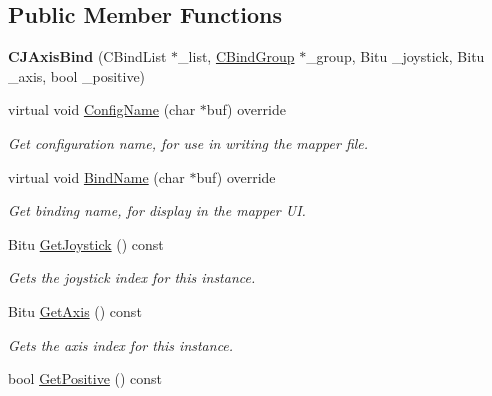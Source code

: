 \subsection*{Public Member Functions}
\begin{DoxyCompactItemize}
\item 
\hypertarget{classCJAxisBind_a80b5b1ae676d9282c7ca3db9d54a9cd6}{{\bfseries C\-J\-Axis\-Bind} (C\-Bind\-List $\ast$\-\_\-list, \hyperlink{classCBindGroup}{C\-Bind\-Group} $\ast$\-\_\-group, Bitu \-\_\-joystick, Bitu \-\_\-axis, bool \-\_\-positive)}\label{classCJAxisBind_a80b5b1ae676d9282c7ca3db9d54a9cd6}

\item 
\hypertarget{classCJAxisBind_ad6469ca1df5b2e95f501cbf66df85ae0}{virtual void \hyperlink{classCJAxisBind_ad6469ca1df5b2e95f501cbf66df85ae0}{Config\-Name} (char $\ast$buf) override}\label{classCJAxisBind_ad6469ca1df5b2e95f501cbf66df85ae0}

\begin{DoxyCompactList}\small\item\em Get configuration name, for use in writing the mapper file. \end{DoxyCompactList}\item 
\hypertarget{classCJAxisBind_a975eada416c60a679dda6574cc4d5bd5}{virtual void \hyperlink{classCJAxisBind_a975eada416c60a679dda6574cc4d5bd5}{Bind\-Name} (char $\ast$buf) override}\label{classCJAxisBind_a975eada416c60a679dda6574cc4d5bd5}

\begin{DoxyCompactList}\small\item\em Get binding name, for display in the mapper U\-I. \end{DoxyCompactList}\item 
\hypertarget{classCJAxisBind_a033065f2f64ac52bfac7bf1d0aff17c3}{Bitu \hyperlink{classCJAxisBind_a033065f2f64ac52bfac7bf1d0aff17c3}{Get\-Joystick} () const }\label{classCJAxisBind_a033065f2f64ac52bfac7bf1d0aff17c3}

\begin{DoxyCompactList}\small\item\em Gets the joystick index for this instance. \end{DoxyCompactList}\item 
\hypertarget{classCJAxisBind_a6d9c9e742943700c75971a13bd827d42}{Bitu \hyperlink{classCJAxisBind_a6d9c9e742943700c75971a13bd827d42}{Get\-Axis} () const }\label{classCJAxisBind_a6d9c9e742943700c75971a13bd827d42}

\begin{DoxyCompactList}\small\item\em Gets the axis index for this instance. \end{DoxyCompactList}\item 
\hypertarget{classCJAxisBind_a8693e360c96fe5f86d2cd46eb1f9cf6e}{bool \hyperlink{classCJAxisBind_a8693e360c96fe5f86d2cd46eb1f9cf6e}{Get\-Positive} () const }\label{classCJAxisBind_a8693e360c96fe5f86d2cd46eb1f9cf6e}


\end{DoxyCompactItemize}
